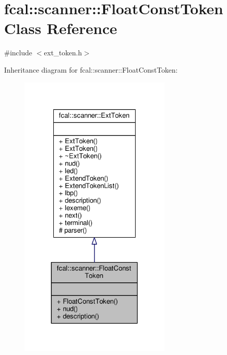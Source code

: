\hypertarget{classfcal_1_1scanner_1_1FloatConstToken}{}\section{fcal\+:\+:scanner\+:\+:Float\+Const\+Token Class Reference}
\label{classfcal_1_1scanner_1_1FloatConstToken}


{\ttfamily \#include $<$ext\+\_\+token.\+h$>$}



Inheritance diagram for fcal\+:\+:scanner\+:\+:Float\+Const\+Token\+:
\nopagebreak
\begin{figure}[H]
\begin{center}
\leavevmode
\includegraphics[width=207pt]{classfcal_1_1scanner_1_1FloatConstToken__inherit__graph}
\end{center}
\end{figure}


